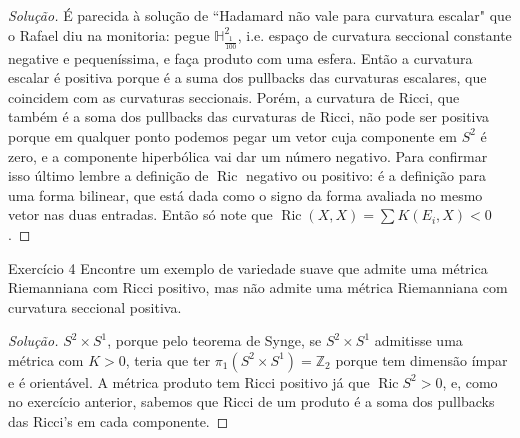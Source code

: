 \begin{proof}[Solução]\leavevmode
	É parecida à solução de ``Hadamard não vale para curvatura escalar" que o Rafael diu na monitoria: pegue \(\mathbb{H}^{2}_{\frac{1}{100}}\), i.e. espaço de curvatura seccional constante negative e pequeníssima, e faça produto com uma esfera. Então a curvatura escalar é positiva porque é a suma dos pullbacks das curvaturas escalares, que coincidem com as curvaturas seccionais. Porém, a curvatura de Ricci, que também é a soma dos pullbacks das curvaturas de Ricci, não pode ser positiva porque em qualquer ponto podemos pegar um vetor cuja componente em \(S^2\) é zero, e a componente hiperbólica vai dar um número negativo. Para confirmar isso último 
	lembre a definição de \(\operatorname{Ric}\) negativo ou positivo: é a definição para uma forma bilinear, que está dada como o signo da forma avaliada no mesmo vetor nas duas entradas. Então só note que \(\operatorname{Ric}(X,X)=\sum K(E_i,X)<0\).

\end{proof}

\begin{thing6}{Exercício 4}\label{exer:4}\leavevmode
Encontre um exemplo de variedade suave que admite uma métrica Riemanniana com Ricci positivo, mas não admite uma métrica Riemanniana com curvatura seccional positiva.
\end{thing6}

\begin{proof}[Solução]\leavevmode
\(S^2\times S^1\), porque pelo teorema de Synge, se \(S^2\times S^1\) admitisse uma métrica com \(K>0\), teria que ter \(\pi_{1}(S^2 \times S^1)=\mathbb{Z}_2\) porque tem dimensão ímpar e é orientável. A métrica produto tem Ricci positivo já que \(\operatorname{Ric}S^2>0\), e, como no exercício anterior, sabemos que Ricci de um produto é a soma dos pullbacks das Ricci's em cada componente.

\end{proof}


